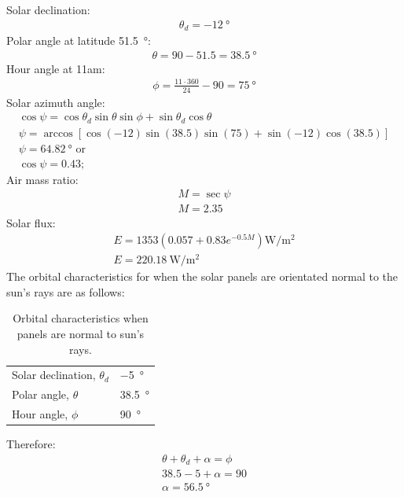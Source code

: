 \documentclass[11pt]{article}
\numberwithin{equation}{section}
\begin{document}
Solar declination:
\begin{gather}
    \theta_d = \SI{-12}{\degree}
\end{gather}
Polar angle at latitude \SI{51.5}{\degree}:
\begin{gather}
    \theta = 90 - 51.5 = \SI{38.5}{\degree}
\end{gather}
Hour angle at 11am:
\begin{gather}
    \phi = \frac{11\cdot 360}{24} -90 = \SI{75}{\degree}
\end{gather}
Solar azimuth angle:
\begin{gather}
    \cos \psi = \cos \theta_d \sin\theta \sin \phi + \sin\theta_d \cos \theta\\
    \psi = \arccos\left[\cos \left(-12\right)\sin\left(38.5\right)\sin\left(75\right) + \sin\left(-12\right)\cos\left(38.5\right)\right]\\
    \psi = \SI{64.82}{\degree} \textrm{ or}\\
    \cos\psi = 0.43;
\end{gather}
Air mass ratio:
\begin{gather}
    M = \sec\psi\\
    M = 2.35
\end{gather}
Solar flux:
\begin{gather}
    E = 1353\left(0.057+0.83e^{-0.5M}\right) \si{\watt\per\meter\squared}\\
    E = \SI{220.18}{\watt\per\meter\squared}
\end{gather}
The orbital characteristics for when the solar panels are orientated normal to the sun's rays are as follows:
\begin{table}[H]
    \centering
    \begin{tabular}{@{}ll@{}}
        \toprule
        Solar declination, $\theta_d$ & \SI{-5}{\degree}    \\
        Polar angle, $\theta$         & \SI{38.5}{\degree}  \\
        Hour angle, $\phi$            & \SI{90}{\degree}    \\ 
        \bottomrule
    \end{tabular}
    \caption{Orbital characteristics when panels are normal to sun's rays.}
\end{table}
Therefore:
\begin{gather}
    \theta + \theta_d + \alpha = \phi\\
    38.5 - 5 + \alpha = 90\\
    \alpha = \SI{56.5}{\degree}
\end{gather}
\end{document}
